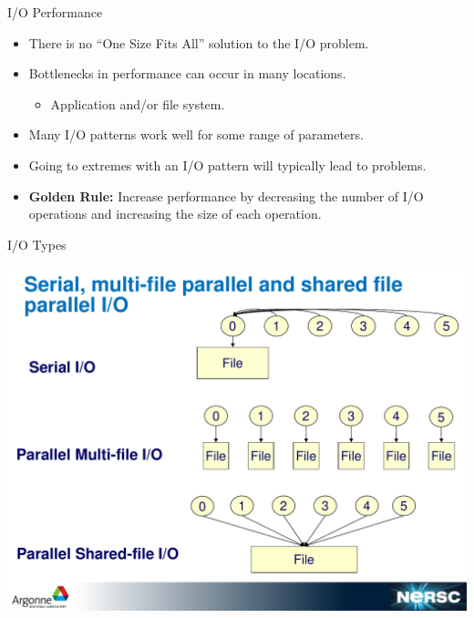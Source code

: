 \documentclass[compress,11pt,xcolor=svgnames,aspectratio=169]{beamer}
\begin{document}
\begin{frame}[fragile]{I/O Performance}

\begin{itemize}
\setlength\itemsep{0.5cm}

  \item There is no ``One Size Fits All'' solution to the I/O problem.

  \item Bottlenecks in performance can occur in many locations.

  \begin{itemize}
    \item Application and/or file system.
  \end{itemize}

  \item Many I/O patterns work well for some range of parameters.

  \item Going to extremes with an I/O pattern will typically lead to problems.

  \item {\color{gold}\textbf{Golden Rule:}} Increase performance by decreasing the number of I/O operations and increasing the size of each operation.

\end{itemize}

\nocite{PIOTAPO12}

\end{frame}

\begin{frame}[fragile]{I/O Types}

\begin{center}
\includegraphics[scale=0.35]{io-types}
\end{center}

\end{frame}
\end{document}
